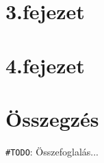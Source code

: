 \documentclass[tocnopagenum]{thesis-ekf}
\theoremstyle{definition}
\theoremstyle{remark}
\begin{document}
	\chapter*{3.fejezet}

	\chapter*{4.fejezet}

	\chapter*{Összegzés}
	


	
	\verb*|#TODO|: Összefoglalás...
	
	

		\listoffigures
\end{document}
